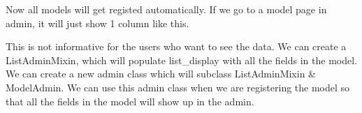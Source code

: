 \documentclass[a5paper,10pt,english]{sphinxmanual}
\begin{document}
\begin{sphinxVerbatim}[commandchars=\\\{\}]
    
   


 
      

     
          
           
             
\end{sphinxVerbatim}

Now all models will get registed automatically. If we go to a model page in admin, it will just show 1 column like this.


This is not informative for the users who want to see the data. We can create a ListAdminMixin, which will populate list\_display with all the fields in the model. We can create a new admin class which will subclass ListAdminMixin \& ModelAdmin. We can use this admin class when we are registering the model so that all the fields in the model will show up in the admin.
\end{document}
